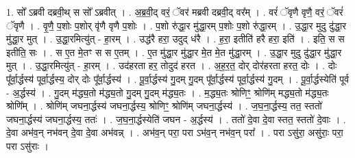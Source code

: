 \documentclass[17pt]{extarticle}
\begin{document}
1. सो᳚ ऽब्रवी दब्रवी॒थ् स सो᳚ ऽब्रवीत् । . अ॒ब्र॒वी॒द् वरं॒ ॅवर॑ मब्रवी दब्रवी॒द् वर᳚म् । . वरं॑ ॅवृणै वृणै॒ वरं॒ ॅवरं॑ ॅवृणै । . वृ॒णै॒ प॒शोः प॒शोर् वृ॑णै वृणै प॒शोः । . प॒शो रु॑द्धा॒र मु॑द्धा॒रम् प॒शोः प॒शो रु॑द्धा॒रम् । . उ॒द्धा॒र मुदु दु॑द्धा॒र मु॑द्धा॒र मुत् । . उ॒द्धा॒रमित्यु॑त् - हा॒रम् । . उद्ध॑रै हरा॒ उदुद् ध॑रै । . ह॒रा॒ इतीति॑ हरै हरा॒ इति॑ । . इति॒ स स इतीति॒ सः । . स ए॒त मे॒तꣳ स स ए॒तम् । . ए॒त मु॑द्धा॒र मु॑द्धा॒र मे॒त मे॒त मु॑द्धा॒रम् । . उ॒द्धा॒र मुदु दु॑द्धा॒र मु॑द्धा॒र मुत् । . उ॒द्धा॒रमित्यु॑त् - हा॒रम् । . उद॑हरता हर॒ तोदुद॑ हरत । . अ॒ह॒र॒त॒ दोर् दोर॑हरता हरत॒ दोः । . दोः पू᳚र्वा॒र्द्धस्य॑ पूर्वा॒र्द्धस्य॒ दोर् दोः पू᳚र्वा॒र्द्धस्य॑ । . पू॒र्वा॒र्द्धस्य॑ गु॒दम् गु॒दम् पू᳚र्वा॒र्द्धस्य॑ पूर्वा॒र्द्धस्य॑ गु॒दम् । . पू॒र्वा॒र्द्धस्येति॑ पूर्व - अ॒र्द्धस्य॑ । . गु॒दम् म॑द्ध्य॒तो म॑द्ध्य॒तो गु॒दम् गु॒दम् म॑द्ध्य॒तः । . म॒द्ध्य॒तः श्रोणिꣳ॒॒ श्रोणि॑म् मद्ध्य॒तो म॑द्ध्य॒तः श्रोणि᳚म् । . श्रोणि॑म् जघना॒र्द्धस्य॑ जघना॒र्द्धस्य॒ श्रोणिꣳ॒॒ श्रोणि॑म् जघना॒र्द्धस्य॑ । . ज॒घ॒ना॒र्द्धस्य॒ तत॒ स्ततो॑ जघना॒र्द्धस्य॑ जघना॒र्द्धस्य॒ ततः॑ । . ज॒घ॒ना॒र्द्धस्येति॑ जघन - अ॒र्द्धस्य॑ । . ततो॑ दे॒वा दे॒वा स्तत॒ स्ततो॑ दे॒वाः । . दे॒वा अभ॑व॒न् नभ॑वन् दे॒वा दे॒वा अभ॑वन्न् । . अभ॑व॒न् परा॒ परा ऽभ॑व॒न् नभ॑व॒न् परा᳚ । . परा ऽसु॑रा॒ असु॑राः॒ परा॒ परा ऽसु॑राः । \newline
\end{document}
